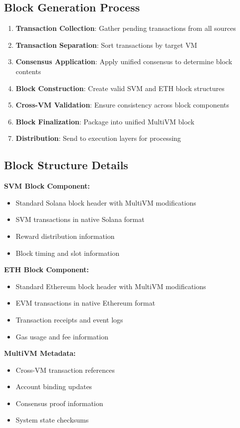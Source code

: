 \documentclass[11pt,a4paper]{article}
\begin{document}
\subsection{Block Generation Process}
\begin{enumerate}
    \item \textbf{Transaction Collection}: Gather pending transactions from all sources
    \item \textbf{Transaction Separation}: Sort transactions by target VM
    \item \textbf{Consensus Application}: Apply unified consensus to determine block contents
    \item \textbf{Block Construction}: Create valid SVM and ETH block structures
    \item \textbf{Cross-VM Validation}: Ensure consistency across block components
    \item \textbf{Block Finalization}: Package into unified MultiVM block
    \item \textbf{Distribution}: Send to execution layers for processing
\end{enumerate}

\subsection{Block Structure Details}
\textbf{SVM Block Component:}
\begin{itemize}
    \item Standard Solana block header with MultiVM modifications
    \item SVM transactions in native Solana format
    \item Reward distribution information
    \item Block timing and slot information
\end{itemize}

\textbf{ETH Block Component:}
\begin{itemize}
    \item Standard Ethereum block header with MultiVM modifications
    \item EVM transactions in native Ethereum format
    \item Transaction receipts and event logs
    \item Gas usage and fee information
\end{itemize}

\textbf{MultiVM Metadata:}
\begin{itemize}
    \item Cross-VM transaction references
    \item Account binding updates
    \item Consensus proof information
    \item System state checksums
\end{itemize}
\end{document}

